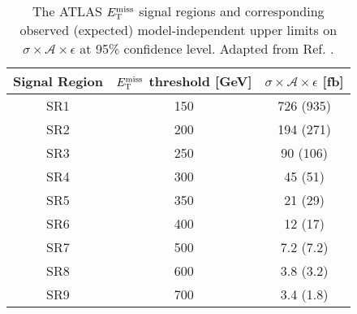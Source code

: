\begin{table}[!htbp]
\centering
\begin{tabular}{c|c|c}
 \hline
 \hline
 Signal Region & $E_{\mathrm{T}}^{\mathrm{miss}}$ threshold [GeV] & $\sigma \times \mathcal{A} \times \epsilon$ [fb] \\ %
 \hline
 SR1 & 150 & 726 (935) \\ %
 SR2 & 200 & 194 (271) \\ %
 SR3 & 250 & 90 (106) \\ %
 SR4 & 300 & 45 (51) \\ %
 SR5 & 350 & 21 (29) \\ %
 SR6 & 400 & 12 (17) \\ %
 SR7 & 500 & 7.2 (7.2) \\ %
 SR8 & 600 & 3.8 (3.2) \\ %
 SR9 & 700 & 3.4 (1.8) \\ %
 \hline
 \hline
\end{tabular}
\caption{The ATLAS \monojet $E_{\mathrm{T}}^{\mathrm{miss}}$ signal regions and corresponding observed (expected) model-independent upper limits on $\sigma \times \mathcal{A} \times \epsilon$ at 95\% confidence level. Adapted from Ref. \cite{Aad:2015zva}.
}
\label{monojet_SRs}
\end{table}

